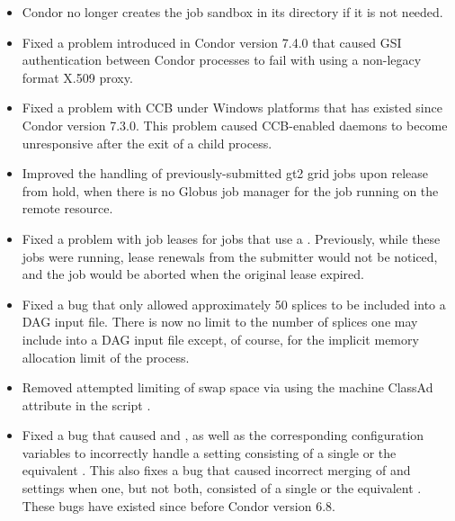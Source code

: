 \begin{itemize}

\item  Condor no longer creates the job sandbox in its 
directory if it is not needed.

\item Fixed a problem introduced in Condor version 7.4.0 that caused GSI
authentication between Condor processes to fail with using a
non-legacy format X.509 proxy.

\item Fixed a problem with CCB under Windows platforms that has existed since
Condor version 7.3.0.  
This problem caused CCB-enabled daemons to become unresponsive
after the exit of a child process.


\item Improved the handling of previously-submitted gt2 grid jobs upon
release from hold, when there is no Globus job manager for the job running
on the remote resource.

\item Fixed a problem with job leases for jobs that use a .
Previously, while these jobs were running, lease renewals from the 
submitter would not be
noticed, and the job would be aborted when the original lease expired.

\item Fixed a bug that only allowed approximately 50 splices to be included into
a DAG input file. There is now no limit to the number of splices
one may include into a DAG input file except, of course, for the
implicit memory allocation limit of the  process.

\item Removed attempted limiting of swap space via  using the
 machine ClassAd attribute in the script
.

\item Fixed a bug that caused  and
  , as well as the corresponding
   configuration variables to incorrectly handle a
  setting consisting of a single \Expr{*} or the equivalent \Expr{*/*}.  This
  also fixes a bug that caused incorrect merging of 
  and  settings when one, but not both, consisted of
  a single \Expr{*} or the equivalent \Expr{*/*}.
  These bugs have existed since before Condor version 6.8.


\end{itemize}
